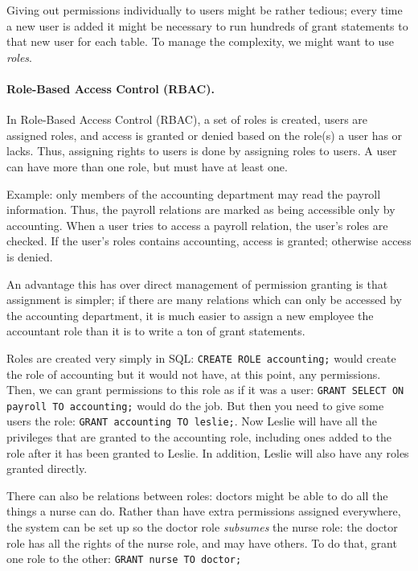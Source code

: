 \documentclass[a4paper]{report}
\begin{document}
Giving out permissions individually to users might be rather tedious; every time a new user is added it might be necessary to run hundreds of grant statements to that new user for each table. To manage the complexity, we might want to use \textit{roles}. 

\paragraph{Role-Based Access Control (RBAC).} In Role-Based Access Control (RBAC), a set of roles is created, users are assigned roles, and access is granted or denied based on the role(s) a user has or lacks. Thus, assigning rights to users is done by assigning roles to users. A user can have more than one role, but must have at least one.

Example: only members of the accounting department may read the payroll information. Thus, the payroll relations are marked as being accessible only by accounting. When a user tries to access a payroll relation, the user's roles are checked. If the user's roles contains accounting, access is granted; otherwise access is denied.

An advantage this has over direct management of permission granting is that assignment is simpler; if there are many relations which can only be accessed by the accounting department, it is much easier to assign a new employee the accountant role than it is to write a ton of grant statements.

Roles are created very simply in SQL: \texttt{CREATE ROLE accounting;} would create the role of accounting but it would not have, at this point, any permissions. Then, we can grant permissions to this role as if it was a user: \texttt{GRANT SELECT ON payroll TO accounting;} would do the job. But then you need to give some users the role: \texttt{GRANT accounting TO leslie;}. Now Leslie will have all the privileges that are granted to the accounting role, including ones added to the role after it has been granted to Leslie. In addition, Leslie will also have any roles granted directly. 

There can also be relations between roles: doctors might be able to do all the things a nurse can do. Rather than have extra permissions assigned everywhere, the system can be set up so the doctor role \textit{subsumes} the nurse role: the doctor role has all the rights of the nurse role, and may have others. To do that, grant one role to the other: \texttt{GRANT nurse TO doctor;}
\end{document}
